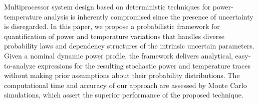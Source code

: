 Multiprocessor system design based on deterministic techniques for power-temperature analysis is inherently compromised since the presence of uncertainty is disregarded. In this paper, we propose a probabilistic framework for quantification of power and temperature variations that handles diverse probability laws and dependency structures of the intrinsic uncertain parameters. Given a nominal dynamic power profile, the framework delivers analytical, easy-to-analyze expressions for the resulting stochastic power and temperature traces without making prior assumptions about their probability distributions. The computational time and accuracy of our approach are assessed by Monte Carlo simulations, which assert the superior performance of the proposed technique.

